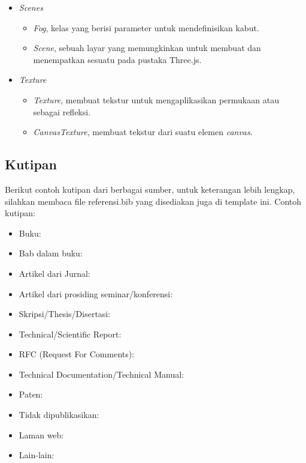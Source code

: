 \begin{itemize}
\item \textit{Scenes}

	\begin{itemize}
	\item {\it Fog}, kelas yang berisi parameter untuk mendefinisikan kabut.
	\item {\it Scene}, sebuah layar yang memungkinkan untuk membuat dan menempatkan sesuatu pada pustaka Three.js. 
	\end{itemize}
	
\item \textit{Texture}
	\begin{itemize}
	\item {\it Texture}, membuat tekstur untuk mengaplikasikan permukaan atau sebagai refleksi.
	\item {\it CanvasTexture}, membuat tekstur dari suatu elemen {\it canvas}.
	\end{itemize}	
	
\end{itemize}
 
\subsection{Kutipan}
\label{subs:kutipan} 
Berikut contoh kutipan dari berbagai sumber, untuk keterangan lebih lengkap, silahkan membaca file referensi.bib yang disediakan juga di template ini.
Contoh kutipan:
\begin{itemize}
	\item Buku:~\cite{berg:08:compgeom} 
	\item Bab dalam buku:~\cite{kreveld:04:GIS}
	\item Artikel dari Jurnal:~\cite{buchin:13:median}
	\item Artikel dari prosiding seminar/konferensi:~\cite{kreveld:11:median}
	\item Skripsi/Thesis/Disertasi:~\cite{lionov:02:animasi}~\cite{wiratma:10:following}~\cite{wiratma:22:later}
	\item Technical/Scientific Report:~\cite{kreveld:07:watertight}
	\item RFC (Request For Comments):~\cite{RFC1654}
	\item Technical Documentation/Technical Manual:~\cite{Z.500}~\cite{unicode:16:stdv9}~\cite{google:16:and7}
	\item Paten:~\cite{webb:12:comm}
	\item Tidak dipublikasikan:~\cite{wiratma:09:median}~\cite{lionov:11:cpoly}
	\item Laman web:~\cite{erickson:03:cgmodel}  
	\item Lain-lain:~\cite{agung:12:tango}
\end{itemize}    
  
